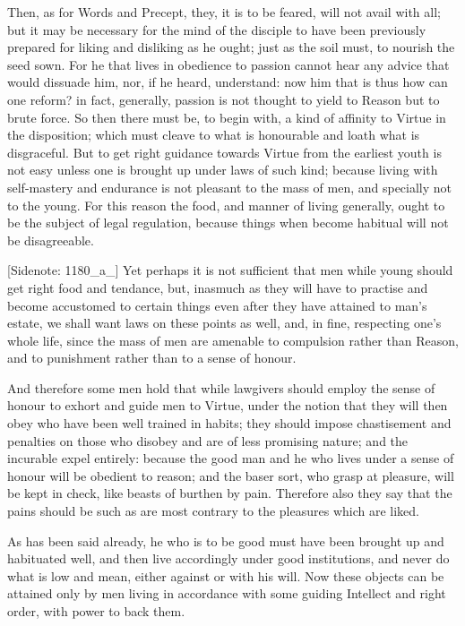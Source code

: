 Then, as for Words and Precept, they, it is to be feared, will not avail
with all; but it may be necessary for the mind of the disciple to have
been previously prepared for liking and disliking as he ought; just as
the soil must, to nourish the seed sown. For he that lives in obedience
to passion cannot hear any advice that would dissuade him, nor, if he
heard, understand: now him that is thus how can one reform? in fact,
generally, passion is not thought to yield to Reason but to brute force.
So then there must be, to begin with, a kind of affinity to Virtue in
the disposition; which must cleave to what is honourable and loath
what is disgraceful. But to get right guidance towards Virtue from the
earliest youth is not easy unless one is brought up under laws of such
kind; because living with self-mastery and endurance is not pleasant to
the mass of men, and specially not to the young. For this reason the
food, and manner of living generally, ought to be the subject of
legal regulation, because things when become habitual will not be
disagreeable.

[Sidenote: 1180_a_] Yet perhaps it is not sufficient that men while
young should get right food and tendance, but, inasmuch as they will
have to practise and become accustomed to certain things even after they
have attained to man's estate, we shall want laws on these points as
well, and, in fine, respecting one's whole life, since the mass of men
are amenable to compulsion rather than Reason, and to punishment rather
than to a sense of honour.

And therefore some men hold that while lawgivers should employ the sense
of honour to exhort and guide men to Virtue, under the notion that they
will then obey who have been well trained in habits; they should
impose chastisement and penalties on those who disobey and are of less
promising nature; and the incurable expel entirely: because the good man
and he who lives under a sense of honour will be obedient to reason;
and the baser sort, who grasp at pleasure, will be kept in check, like
beasts of burthen by pain. Therefore also they say that the pains should
be such as are most contrary to the pleasures which are liked.

As has been said already, he who is to be good must have been brought up
and habituated well, and then live accordingly under good institutions,
and never do what is low and mean, either against or with his will. Now
these objects can be attained only by men living in accordance with some
guiding Intellect and right order, with power to back them.

